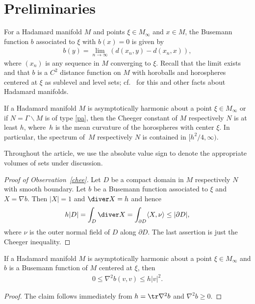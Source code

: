 \section{Preliminaries}

For a Hadamard manifold $M$ and points $\xi\in M_\infty$ and $x\in M$,
the Busemann function $b$ associated to $\xi$ with $b(x)=0$ is given by
\begin{align*}
	b(y) = \lim_{n\to\infty} (d(x_n,y)-d(x_n,x)),
\end{align*}
where $(x_n)$ is any sequence in $M$ converging to $\xi$.
Recall that the limit exists and that $b$ is a $C^2$ distance function on $M$
with horoballs and horospheres centered at $\xi$ as sublevel and level sets;
cf.~\cite{Ba95} for this and other facts about Hadamard manifolds.

\begin{obs}\label{chee}
If a Hadamard manifold $M$ is asymptotically harmonic about a point $\xi\in M_\infty$
or if $N=\Gamma\backslash M$ is of type {\rm \ref{pa}},
then the Cheeger constant of $M$ respectively $N$ is at least $h$,
where~$h$ is the mean curvature of the horospheres with center $\xi$.
In particular, the spectrum of~$M$ respectively $N$ is contained in $\bigl[h^2/4,\infty\bigr)$.
\end{obs}

Throughout the article,
we use the absolute value sign to denote the appropriate volumes of sets under discussion.

\begin{proof}[Proof of Observation~\ref{chee}]
Let $D$ be a compact domain in $M$ respectively $N$ with smooth boundary.
Let $b$ be a Busemann function associated to $\xi$ and $X=\nabla b$.
Then $|X|=1$ and $\diver X=h$ and hence
\begin{align*}
	h|D| = \int_D\diver X = \int_{\partial D}\langle X,\nu\rangle \le |\partial D|,
\end{align*}
where $\nu$ is the outer normal field of $D$ along $\partial D$.
The last assertion is just the Cheeger in\-equality.
\end{proof}

\begin{obs}\label{obs}
If a Hadamard manifold $M$ is asymptotically harmonic about a point $\xi\in M_\infty$
and $b$ is a Busemann function of $M$ centered at $\xi$, then
\begin{align*}
	0 \le \nabla^2b(v,v) \le h |v|^2.
\end{align*}
\end{obs}

\begin{proof}
The claim follows immediately from $h=\tr\nabla^2b$ and $\nabla^2b\ge0$.
\end{proof}
